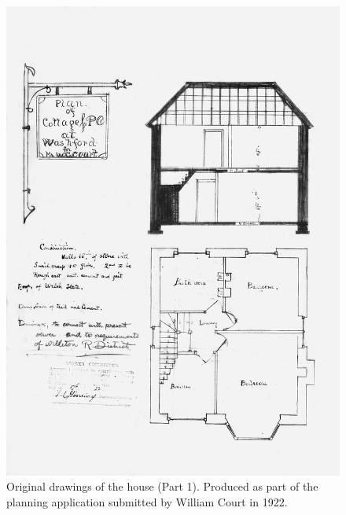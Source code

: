 \begin{figure}[p]
     \includegraphics[width=1\textwidth]{figures/HillHeadHousePlans1}
     \caption{Original drawings of the house (Part 1). Produced as part of the planning application submitted by William Court in 1922.}
     \label{fig:HousePlans1}
\end{figure}

